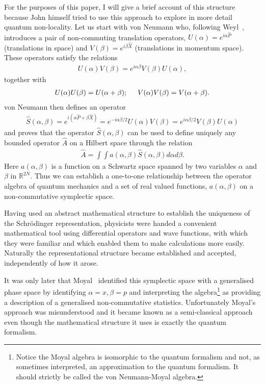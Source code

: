 \documentclass[11pt]{article}
\begin{document}
For the purposes of this paper, I will give a brief account of this structure because John himself tried to use this approach to explore in more detail quantum non-locality.  Let us  start with von Neumann who, following Weyl~\cite{hw28}, 
 introduces a pair of non-commuting translation operators, $U(\alpha)=e^{i\alpha {\widehat P}}$ (translations in space) and $V(\beta)=e^{i\beta{\widehat X}}$ (translations in momentum space).  These operators satisfy the relations   
\begin{eqnarray}
U(\alpha)V(\beta) = e^{i\alpha\beta}V(\beta)U(\alpha),	\label{eq:Weyl}
\end{eqnarray}
together with
\begin{eqnarray}
U(\alpha)U(\beta)=U(\alpha + \beta);  \hspace{0.5cm}  V(\alpha)V(\beta)=V(\alpha + \beta). \nonumber
\end{eqnarray}						
von Neumann then defines an operator
\begin{eqnarray}
\widehat S(\alpha,\beta)=e^{i(\alpha\widehat P+\beta \widehat X)}=e^{-i\alpha\beta/2}U(\alpha)V(\beta)=e^{i\alpha\beta/2}V(\beta)U(\alpha)  \nonumber
\end{eqnarray}
and proves that the operator $\widehat S(\alpha, \beta)$ can  be used to define uniquely any bounded operator $\hat A$ on a Hilbert space  through the relation
\begin{eqnarray}
\hat A=\int\int a(\alpha, \beta)\widehat S(\alpha,\beta)d\alpha d\beta.
\label{eq:symA}				%
\end{eqnarray}
Here $a(\alpha,\beta)$ is a function on a Schwartz space spanned by two variables $\alpha$ and $\beta$ in $\mathbb R^{2N}$. Thus we can establish a one-to-one relationship between the operator algebra of quantum mechanics and a set of real valued functions, $a(\alpha, \beta)$ on a non-commutative symplectic space.

Having used an abstract mathematical structure to establish the uniqueness of the Schr\"{o}dinger representation, physicists were handed a convenient mathematical tool using differential operators and wave functions, with which they were familiar and which enabled them to make calculations more easily.  Naturally the representational structure became established and accepted, independently of how it arose.

It was only later that Moyal~\cite{jm49} identified this symplectic space with a generalised phase space by identifying $\alpha=x, \beta=p$ and interpreting the algebra\footnote{Notice the Moyal algebra is isomorphic to the quantum formalism and not, as sometimes interpreted, an approximation to the quantum formalism. It should strictly be called the von Neumann-Moyal algebra.}  as providing a description of a generalised non-commutative statistics.  Unfortunately Moyal's approach was misunderstood and it became known as a semi-classical approach even though the mathematical structure it uses is exactly the quantum formalism.   
\end{document}
